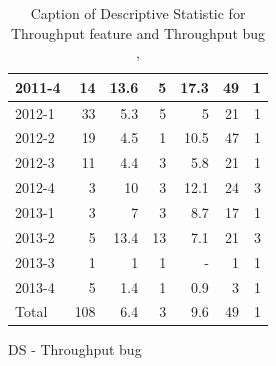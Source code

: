 \documentclass[UKenglish]{ifimaster}  %
\begin{document}
\begin{appendices}
\begin{table}[!htbp]
\begin{adjustwidth}{-2.5cm}{}
\begin{subfigure}[b]{0.3\textwidth}
{\begin{tabular}{ | l | r | r | r | r | r | r | }
 2011-4  & 14 & 13.6 & 5 & 17.3 & 49 & 1 \\ \hline
 2012-1  & 33 & 5.3 & 5 & 5 & 21 & 1 \\ \hline
 2012-2  & 19 & 4.5 & 1 & 10.5 & 47 & 1 \\ \hline
 2012-3  & 11 & 4.4 & 3 & 5.8 & 21 & 1 \\ \hline
 2012-4  & 3 & 10 & 3 & 12.1 & 24 & 3 \\ \hline
 2013-1  & 3 & 7 & 3 & 8.7 & 17 & 1 \\ \hline
 2013-2  & 5 & 13.4 & 13 & 7.1 & 21 & 3 \\ \hline
 2013-3  & 1 & 1 & 1 & - & 1 & 1 \\ \hline
 2013-4  & 5 & 1.4 & 1 & 0.9 & 3 & 1 \\ \hline
 Total  & 108 & 6.4 & 3 & 9.6 & 49 & 1 \\ \hline
\end{tabular}
}
\caption{DS - Throughput bug}
 \label{DS:TPB:1}
\end{subfigure}
\end{adjustwidth}
\caption[Optional caption for list of figures]{Caption of Descriptive Statistic for Throughput feature and Throughput bug  , }
\label{DS:1:2}
\end{table}




\end{appendices}
\end{document}

